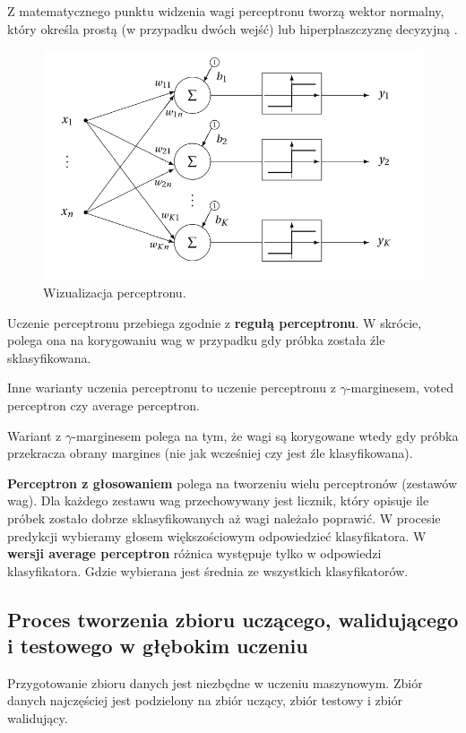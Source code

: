 \documentclass[wi]{zut}
\begin{document}
 Z matematycznego punktu widzenia wagi perceptronu tworzą wektor normalny, który określa prostą (w przypadku dwóch wejść) lub hiperpłaszczyznę decyzyjną \cite{wiki:Perceptron}.

\begin{figure}[H]
    \centering
    \includegraphics[width=0.5\linewidth]{images/perceptron.png}
    \caption{Wizualizacja perceptronu.}
    \label{fig:apriori}
\end{figure}

Uczenie perceptronu przebiega zgodnie z \textbf{regułą perceptronu}. W skrócie, polega ona na korygowaniu wag w przypadku gdy próbka została źle sklasyfikowana. 

Inne warianty uczenia perceptronu to uczenie perceptronu z $\gamma$-marginesem, voted perceptron czy average perceptron.

Wariant z $\gamma$-marginesem polega na tym, że wagi są korygowane wtedy gdy próbka przekracza obrany margines (nie jak wcześniej czy jest źle klasyfikowana).

\textbf{Perceptron z głosowaniem} polega na tworzeniu wielu perceptronów (zestawów wag). Dla każdego zestawu wag przechowywany jest licznik, który opisuje ile próbek zostało dobrze sklasyfikowanych aż wagi należało poprawić. W procesie predykcji wybieramy głosem większościowym odpowiedzieć klasyfikatora. W \textbf{wersji average perceptron} różnica występuje tylko w odpowiedzi klasyfikatora. Gdzie wybierana jest średnia ze wszystkich klasyfikatorów.
\question




\subsection{Proces tworzenia zbioru uczącego, walidującego i testowego w głębokim uczeniu}

Przygotowanie zbioru danych jest niezbędne w uczeniu maszynowym. Zbiór danych najczęściej jest podzielony na zbiór uczący, zbiór testowy i zbiór walidujący. 
\end{document}

